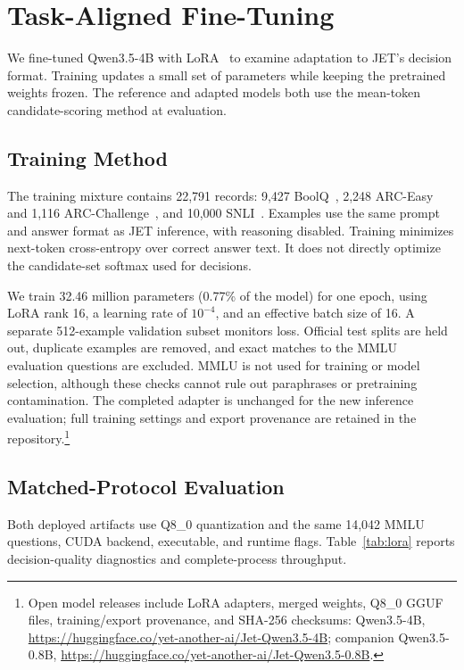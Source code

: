 \section{Task-Aligned Fine-Tuning}
\label{sec:finetuning}
We fine-tuned Qwen3.5-4B with LoRA~\cite{lora} to examine adaptation to JET's
decision format. Training updates a small set of parameters while keeping the
pretrained weights frozen. The reference and adapted models both use the
mean-token candidate-scoring method at evaluation.

\subsection{Training Method}
The training mixture contains 22,791 records: 9,427 BoolQ~\cite{boolq},
2,248 ARC-Easy and 1,116 ARC-Challenge~\cite{arc}, and 10,000
SNLI~\cite{snli}. Examples use the same prompt and answer format as JET
inference, with reasoning disabled. Training minimizes next-token
cross-entropy over correct answer text. It does not directly optimize the
candidate-set softmax used for decisions.

We train 32.46 million parameters (0.77\% of the model) for one epoch, using
LoRA rank 16, a learning rate of $10^{-4}$, and an effective batch size of 16.
A separate 512-example validation subset monitors loss. Official test splits
are held out, duplicate examples are removed, and exact matches to the MMLU
evaluation questions are excluded. MMLU is not used for training or model
selection, although these checks cannot rule out paraphrases or pretraining
contamination. The completed adapter is unchanged for the new inference
evaluation; full training settings and export provenance are retained in the
repository.\footnote{Open model releases include LoRA adapters, merged weights,
Q8\_0 GGUF files, training/export provenance, and SHA-256 checksums:
Qwen3.5-4B, \url{https://huggingface.co/yet-another-ai/Jet-Qwen3.5-4B};
companion Qwen3.5-0.8B,
\url{https://huggingface.co/yet-another-ai/Jet-Qwen3.5-0.8B}.}

\subsection{Matched-Protocol Evaluation}
Both deployed artifacts use Q8\_0 quantization and the same 14,042 MMLU
questions, CUDA backend, executable, and runtime flags. Table~\ref{tab:lora}
reports decision-quality diagnostics and complete-process throughput.

